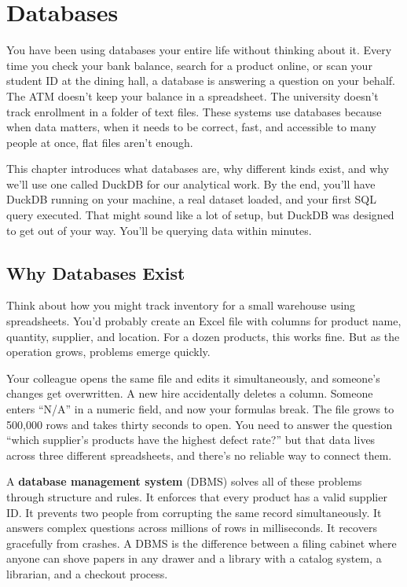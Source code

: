 \documentclass[
  letterpaper,
  DIV=11,
  numbers=noendperiod]{scrreprt}
\begin{document}
\chapter{Databases}\label{databases-1}

You have been using databases your entire life without thinking about
it. Every time you check your bank balance, search for a product online,
or scan your student ID at the dining hall, a database is answering a
question on your behalf. The ATM doesn't keep your balance in a
spreadsheet. The university doesn't track enrollment in a folder of text
files. These systems use databases because when data matters, when it
needs to be correct, fast, and accessible to many people at once, flat
files aren't enough.

This chapter introduces what databases are, why different kinds exist,
and why we'll use one called DuckDB for our analytical work. By the end,
you'll have DuckDB running on your machine, a real dataset loaded, and
your first SQL query executed. That might sound like a lot of setup, but
DuckDB was designed to get out of your way. You'll be querying data
within minutes.

\section{Why Databases Exist}\label{why-databases-exist}

Think about how you might track inventory for a small warehouse using
spreadsheets. You'd probably create an Excel file with columns for
product name, quantity, supplier, and location. For a dozen products,
this works fine. But as the operation grows, problems emerge quickly.

Your colleague opens the same file and edits it simultaneously, and
someone's changes get overwritten. A new hire accidentally deletes a
column. Someone enters ``N/A'' in a numeric field, and now your formulas
break. The file grows to 500,000 rows and takes thirty seconds to open.
You need to answer the question ``which supplier's products have the
highest defect rate?'' but that data lives across three different
spreadsheets, and there's no reliable way to connect them.

A \textbf{database management system} (DBMS) solves all of these
problems through structure and rules. It enforces that every product has
a valid supplier ID. It prevents two people from corrupting the same
record simultaneously. It answers complex questions across millions of
rows in milliseconds. It recovers gracefully from crashes. A DBMS is the
difference between a filing cabinet where anyone can shove papers in any
drawer and a library with a catalog system, a librarian, and a checkout
process.
\end{document}
